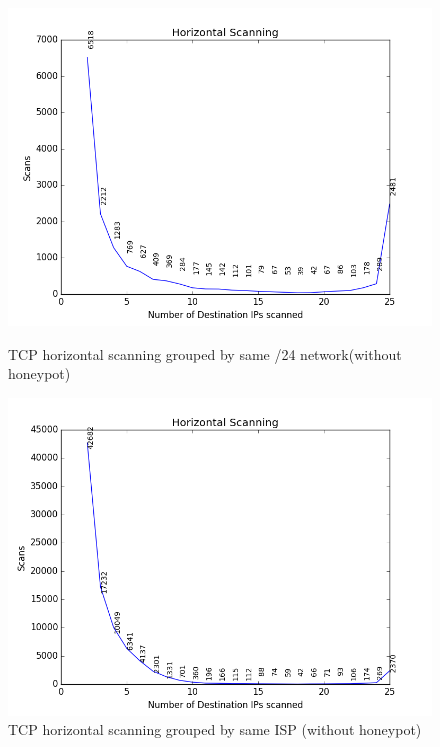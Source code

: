 \begin{figure}[h]
\captionsetup{justification   = raggedright,
              singlelinecheck = false}
\centering
\begin{minipage}{.535\textwidth}
  \centering
  \includegraphics[width=1\linewidth]{images/horizontal_scans_jan_classc}
  \caption{TCP horizontal scanning grouped by same /24 network(without honeypot)}
  \label{fig:test1}
\end{minipage}%
\begin{minipage}{.535\textwidth}
  \centering
  \includegraphics[width=1\linewidth]{images/horizontal_scans_jan_isp}
  \caption{TCP horizontal scanning grouped by same ISP (without honeypot)}
  \label{fig:test2}
\end{minipage}
\end{figure}

